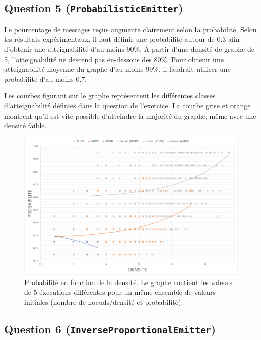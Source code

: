 \documentclass[a4paper]{article}
\begin{document}
\subsection{Question 5 (\texttt{ProbabilisticEmitter})}

Le pourcentage de messages reçus augmente clairement selon la
probabilité. Selon les résultats expérimentaux, il faut définir une probabilité autour
de 0.3 afin d'obtenir une atteignabilité d'au moins 90\%. À partir
d'une densité de graphe de 5, l'atteignabilité ne descend pas
en-dessous des 80\%. Pour obtenir une atteignabilité moyenne du graphe
d'au moins 99\%, il faudrait utiliser une probabilité d'au moins 0.7.

Les courbes figurant sur le graphe représentent les différentes
classes d'atteignabilité définies dans la question de l'exercice. La
courbe grise et orange montrent qu'il est vite possible d'atteindre la
majorité du graphe, même avec une densité faible.

\begin{figure}[H]
\begin{minipage}{\textwidth}
  \centering
    \includegraphics[width=\textwidth]{images/ex2q5-log-trendlines.png}
    \caption{Probabilité en fonction de la densité. Le graphe contient
    les valeurs de 5 éxecutions différentes pour un même ensemble de
    valeurs initiales (nombre de noeuds/densité et probabilité).}
\end{minipage}
\end{figure}

\subsection{Question 6 (\texttt{InverseProportionalEmitter})}
\end{document}
